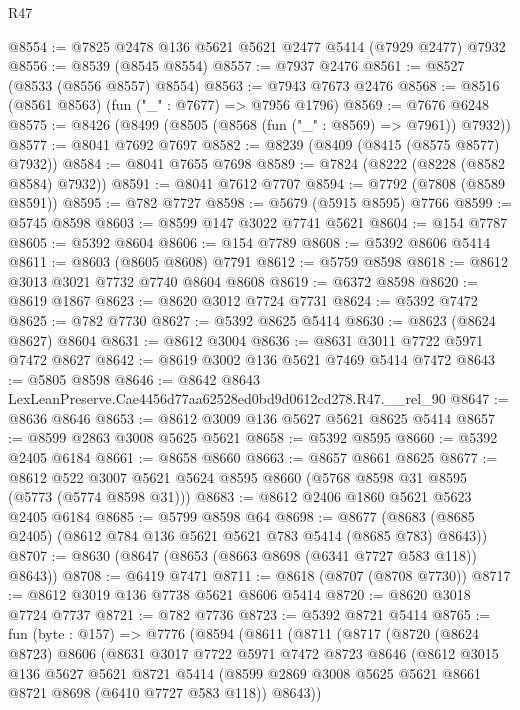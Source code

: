 \begin{lexlean}{R47}
\begin{coremodule}
@8554 := @7825 @2478 @136 @5621 @5621 @2477 @5414 (@7929 @2477) @7932
@8556 := @8539 (@8545 @8554)
@8557 := @7937 @2476
@8561 := @8527 (@8533 (@8556 @8557) @8554)
@8563 := @7943 @7673 @2476
@8568 := @8516 (@8561 @8563) (fun ("_" : @7677) => @7956 @1796)
@8569 := @7676 @6248
@8575 := @8426 (@8499 (@8505 (@8568 (fun ("_" : @8569) => @7961)) @7932))
@8577 := @8041 @7692 @7697
@8582 := @8239 (@8409 (@8415 (@8575 @8577) @7932))
@8584 := @8041 @7655 @7698
@8589 := @7824 (@8222 (@8228 (@8582 @8584) @7932))
@8591 := @8041 @7612 @7707
@8594 := @7792 (@7808 (@8589 @8591))
@8595 := @782 @7727
@8598 := @5679 (@5915 @8595) @7766
@8599 := @5745 @8598
@8603 := @8599 @147 @3022 @7741 @5621
@8604 := @154 @7787
@8605 := @5392 @8604
@8606 := @154 @7789
@8608 := @5392 @8606 @5414
@8611 := @8603 (@8605 @8608) @7791
@8612 := @5759 @8598
@8618 := @8612 @3013 @3021 @7732 @7740 @8604 @8608
@8619 := @6372 @8598
@8620 := @8619 @1867
@8623 := @8620 @3012 @7724 @7731
@8624 := @5392 @7472
@8625 := @782 @7730
@8627 := @5392 @8625 @5414
@8630 := @8623 (@8624 @8627) @8604
@8631 := @8612 @3004
@8636 := @8631 @3011 @7722 @5971 @7472 @8627
@8642 := @8619 @3002 @136 @5621 @7469 @5414 @7472
@8643 := @5805 @8598
@8646 := @8642 @8643 LexLeanPreserve.Cae4456d77aa62528ed0bd9d0612cd278.R47.__rel_90
@8647 := @8636 @8646
@8653 := @8612 @3009 @136 @5627 @5621 @8625 @5414
@8657 := @8599 @2863 @3008 @5625 @5621
@8658 := @5392 @8595
@8660 := @5392 @2405 @6184
@8661 := @8658 @8660
@8663 := @8657 @8661 @8625
@8677 := @8612 @522 @3007 @5621 @5624 @8595 @8660 (@5768 @8598 @31 @8595 (@5773 (@5774 @8598 @31)))
@8683 := @8612 @2406 @1860 @5621 @5623 @2405 @6184
@8685 := @5799 @8598 @64
@8698 := @8677 (@8683 (@8685 @2405) (@8612 @784 @136 @5621 @5621 @783 @5414 (@8685 @783) @8643))
@8707 := @8630 (@8647 (@8653 (@8663 @8698 (@6341 @7727 @583 @118)) @8643))
@8708 := @6419 @7471
@8711 := @8618 (@8707 (@8708 @7730))
@8717 := @8612 @3019 @136 @7738 @5621 @8606 @5414
@8720 := @8620 @3018 @7724 @7737
@8721 := @782 @7736
@8723 := @5392 @8721 @5414
@8765 := fun (byte : @157) =>
  @7776
    (@8594
      (@8611
        (@8711
          (@8717
            (@8720
              (@8624 @8723)
              @8606
              (@8631
                @3017
                @7722
                @5971
                @7472
                @8723
                @8646
                (@8612
                  @3015
                  @136
                  @5627
                  @5621
                  @8721
                  @5414
                  (@8599 @2869 @3008 @5625 @5621 @8661 @8721 @8698 (@6410 @7727 @583 @118))
                  @8643))

\end{coremodule}
\end{lexlean}
